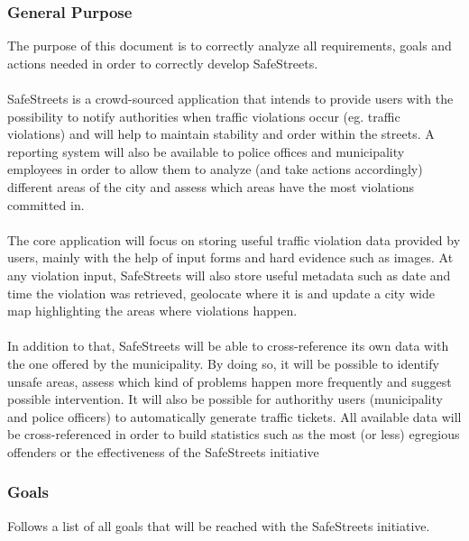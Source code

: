\documentclass{article}
\begin{document}
\subsubsection{General Purpose}
    The purpose of this document is to correctly analyze all requirements, goals
    and actions needed in order to correctly develop SafeStreets.\\
    \\
    SafeStreets is a crowd-sourced application that intends to provide users
    with the possibility to notify authorities when traffic violations occur
    (eg. traffic violations) and will help to maintain stability and order
    within the streets. A reporting system will also be available to police
    offices and municipality employees in order to allow them to analyze (and
    take actions accordingly) different areas of the city and assess which areas
    have the most violations committed in.\\
    \\
    The core application will focus on storing useful traffic violation data
    provided by users, mainly with the help of input forms and hard evidence
    such as images. At any violation input, SafeStreets will also store useful
    metadata such as date and time the violation was retrieved, geolocate where
    it is and update a city wide map highlighting the areas where violations
    happen.\\
    \\
    In addition to that, SafeStreets will be able to cross-reference its own
    data with the one offered by the municipality. By doing so, it will be
    possible to identify unsafe areas, assess which kind of problems happen more
    frequently and suggest possible intervention. It will also be possible for
    authorithy users (municipality and police officers) to automatically
    generate traffic tickets. All available data will be cross-referenced in
    order to build statistics such as the most (or less) egregious offenders or
    the effectiveness of the SafeStreets initiative \subsubsection{Goals}
    Follows a list of all goals that will be reached with the SafeStreets
    initiative.
\end{document}
